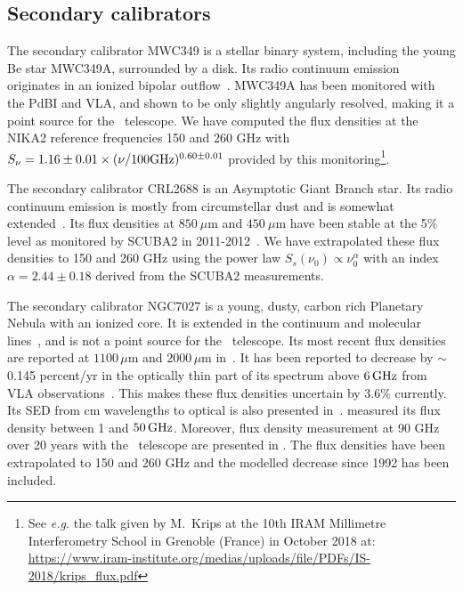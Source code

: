 \subsection{Secondary calibrators}
\label{se:ref_flux_secondaries}


The secondary calibrator MWC349 is a stellar
binary system, including the young Be star MWC349A, surrounded by a
disk. Its radio continuum emission
originates in an ionized bipolar outflow~\citep{Tafoya2004}. MWC349A has
been monitored with the PdBI and VLA, and
shown to be %
only slightly angularly resolved,
making it a point source for the \trentemetre\ telescope.
We have computed the flux densities at the NIKA2 reference frequencies 150 and
260 GHz with $S_\nu = 1.16\pm0.01 \times
(\nu/100 \rm{GHz})^{0.60\pm0.01}$ provided by this
monitoring\footnote{See \emph{e.g.} the talk given by M.~Krips at the 10th 
IRAM Millimetre Interferometry School in Grenoble (France) in October
2018 at: 
\url{https://www.iram-institute.org/medias/uploads/file/PDFs/IS-2018/krips_flux.pdf}}.


The secondary calibrator CRL2688 is an Asymptotic Giant Branch
star. Its radio continuum emission is mostly from circumstellar dust
and is somewhat extended~\citep{Knapp1994}.  Its flux densities at
$850\ \mu$m and $450 \ \mu$m have been stable at the 5\% level as
monitored by SCUBA2 in 2011-2012~\citep{Dempsey2013_SCUBA2}.
We have extrapolated these flux densities to 150 and 260 GHz
using the power law $S_s(\nu_0) \propto \nu_0^{\alpha}$ with an index
$\alpha=2.44\pm0.18$ derived from the SCUBA2 measurements.


The secondary calibrator NGC7027 is a young, dusty, carbon rich
Planetary Nebula with an ionized core.  It is extended in the
continuum and molecular lines~\citep{Bieging1991}, and is not a point
source for the \trentemetre\ telescope.  Its most recent flux densities are
reported at $1100\, \mu$m and $2000\, \mu$m in~\citet{Hoare1992}. It has
been reported to decrease by $\sim$ 0.145 percent/yr in the optically
thin part of its spectrum above $6\,\rm{GHz}$ from VLA
observations~\citep{Zijlstra2008, Hafez2008}. This makes
these flux densities uncertain by 3.6\% currently. Its SED from cm
wavelengths to optical is also presented in~\citet{Hafez2008}. {\lp
\citet{Perley2013} measured its flux density between 1 and $50\,
\rm{GHz}$. Moreover, flux density measurement at 90 GHz over 20 years
with the \trentemetre\ telescope are presented in \citet{Kramer2008}.}
The flux densities have been extrapolated to 150 and 260 GHz and the
modelled decrease since 1992 has been included.

